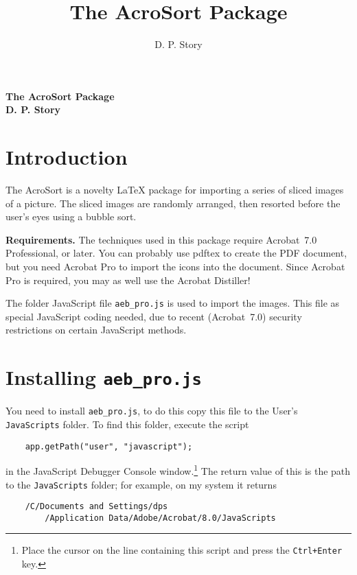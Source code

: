 \documentclass{article}
\title{The AcroSort Package}
\author{D. P. Story}
\begin{document}
\vspace*{-1in}\vskip0in

\begin{center}
\centering\bfseries  \Large\color{blue}The AcroSort Package\\[1ex]
\large D. P. Story
\end{center}

\section{Introduction}


%
The \textsf{AcroSort} is a novelty {\LaTeX} package for importing a
series of sliced images of a picture. The sliced images are randomly
arranged, then resorted before the user's eyes using a bubble sort.

\textbf{\color{blue}Requirements.} The techniques used in this
package require Acrobat~7.0 Professional, or later. You can probably
use \textsf{pdftex} to create the PDF document, but you need Acrobat
Pro to import the icons into the document. Since Acrobat Pro is
required, you may as well use the Acrobat Distiller!

The folder JavaScript file \texttt{aeb\_pro.js} is used to import
the images. This file as special JavaScript coding needed, due to
recent (Acrobat~7.0) security restrictions on certain JavaScript
methods.

\section{Installing \texttt{aeb\_pro.js}}

You need to install \texttt{aeb\_pro.js}, to do this copy this file
to the User's \texttt{Java\-Scripts} folder. To find this folder,
execute the script
\begin{verbatim}
    app.getPath("user", "javascript");
\end{verbatim}
in the JavaScript Debugger Console window.\footnote{Place the cursor
on the line containing this script and press the \texttt{Ctrl+Enter}
key.} The return value of this is the path to the
\texttt{JavaScripts} folder; for example, on my system it returns
\begin{verbatim}
    /C/Documents and Settings/dps
        /Application Data/Adobe/Acrobat/8.0/JavaScripts
\end{verbatim}
\end{document}
